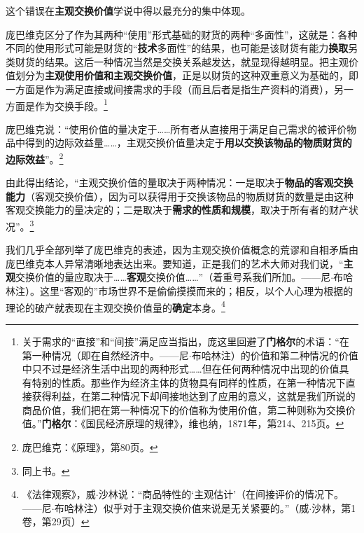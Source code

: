 \documentclass[fontset=fandol, a4paper, 12pt, openright]{ctexbook}
\begin{document}
这个错误在\textbf{主观交换价值}学说中得以最充分的集中体现。

庞巴维克区分了作为其两种“使用”形式基础的财货的两种“多面性”，这就是：各种不同的使用形式可能是财货的“\textbf{技术}多面性”的结果，也可能是该财货有能力\textbf{换取}另类财货的结果。这后一种情况当然是交换关系越发达，就显现得越明显。把主观价值划分为\textbf{主观使用价值和主观交换价值}，正是以财货的这种双重意义为基础的，即一方面是作为满足直接或间接需求的手段（而且后者是指生产资料的消费），另一方面是作为交换手段。\footnote{关于需求的“直接”和“间接”满足应当指出，庞这里回避了\textbf{门格尔}的术语：“在第一种情况（即在自然经济中。——尼$\cdot$布哈林注）的价值和第二种情况的价值中只不过是经济生活中出现的两种形式……但在任何两种情况中出现的价值具有特别的性质。那些作为经济主体的货物具有同样的性质，在第一种情况下直接获得利益，在第二种情况下却间接地达到了应用的意义，这就是我们所说的商品价值，我们把在第一种情况下的价值称为使用价值，第二种则称为交换价值。”\textbf{门格尔}：《国民经济原理的规律》，维也纳，1871年，第214、215页。}

庞巴维克说：“使用价值的量决定于……所有者从直接用于满足自己需求的被评价物品中得到的边际效益量……，主观交换价值量决定于\textbf{用以交换该物品的物质财货的边际效益}”。\footnote{庞巴维克：《原理》，第80页。}

由此得出结论，“主观交换价值的量取决于两种情况：一是取决于\textbf{物品的客观交换能力}（客观交换价值），因为可以获得用于交换该物品的物质财货的数量是由这种客观交换能力的量决定的；二是取决于\textbf{需求的性质和规模}，取决于所有者的财产状况”。\footnote{同上书。}

我们几乎全部列举了庞巴维克的表述，因为主观交换价值概念的荒谬和自相矛盾由庞巴维克本人异常清晰地表达出来。要知道，正是我们的艺术大师对我们说，“\textbf{主观}交换价值的量应取决于……\textbf{客观}交换价值……”（着重号系我们所加。——尼$\cdot$布哈林注）。这里“客观的”市场世界不是偷偷摸摸而来的；相反，以个人心理为根据的理论的破产就表现在主观交换价值量的\textbf{确定}本身。\footnote{《法律观察》，威$\cdot$沙林说：“商品特性的‘主观估计’（在间接评价的情况下。——尼$\cdot$布哈林注）似乎对于主观交换价值来说是无关紧要的。”（威$\cdot$沙林，第1卷，第29页）}
\end{document}

